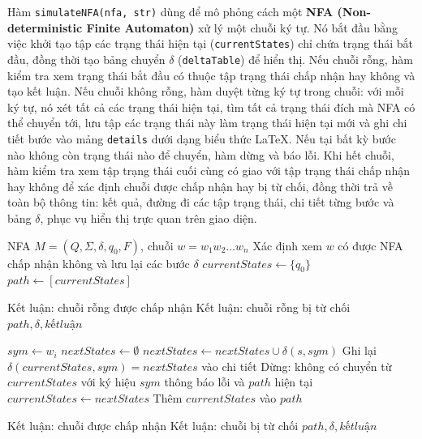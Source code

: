 \documentclass[12pt,a4paper]{report}
\begin{document}
Hàm \texttt{simulateNFA(nfa, str)} dùng để mô phỏng cách một \textbf{NFA (Non-deterministic Finite Automaton)} xử lý một chuỗi ký tự. Nó bắt đầu bằng việc khởi tạo tập các trạng thái hiện tại (\texttt{currentStates}) chỉ chứa trạng thái bắt đầu, đồng thời tạo bảng chuyển $\delta$ (\texttt{deltaTable}) để hiển thị. Nếu chuỗi rỗng, hàm kiểm tra xem trạng thái bắt đầu có thuộc tập trạng thái chấp nhận hay không và tạo kết luận. Nếu chuỗi không rỗng, hàm duyệt từng ký tự trong chuỗi: với mỗi ký tự, nó xét tất cả các trạng thái hiện tại, tìm tất cả trạng thái đích mà NFA có thể chuyển tới, lưu tập các trạng thái này làm trạng thái hiện tại mới và ghi chi tiết bước vào mảng \texttt{details} dưới dạng biểu thức LaTeX. Nếu tại bất kỳ bước nào không còn trạng thái nào để chuyển, hàm dừng và báo lỗi. Khi hết chuỗi, hàm kiểm tra xem tập trạng thái cuối cùng có giao với tập trạng thái chấp nhận hay không để xác định chuỗi được chấp nhận hay bị từ chối, đồng thời trả về toàn bộ thông tin: kết quả, đường đi các tập trạng thái, chi tiết từng bước và bảng $\delta$, phục vụ hiển thị trực quan trên giao diện.
\begin{algorithm}[H]
\caption{Mô phỏng một NFA với chuỗi đầu vào}
\begin{algorithmic}[1]
\Require NFA $M = (Q, \Sigma, \delta, q_0, F)$, chuỗi $w = w_1 w_2 \dots w_n$
\Ensure Xác định xem $w$ có được NFA chấp nhận không và lưu lại các bước $\delta$
\State $currentStates \gets \{q_0\}$
\State $path \gets [currentStates]$

        \State Kết luận: chuỗi rỗng được chấp nhận
    \Else
        \State Kết luận: chuỗi rỗng bị từ chối
    \EndIf
    \State \Return $path, \delta, kết luận$
\EndIf

    \State $sym \gets w_i$
    \State $nextStates \gets \emptyset$
            \State $nextStates \gets nextStates \cup \delta(s, sym)$
        \EndIf
    \EndFor
    \State Ghi lại $\delta(currentStates, sym) = nextStates$ vào chi tiết
        \State Dừng: không có chuyển từ $currentStates$ với ký hiệu $sym$
        \State \Return thông báo lỗi và $path$ hiện tại
    \EndIf
    \State $currentStates \gets nextStates$
    \State Thêm $currentStates$ vào $path$
\EndFor

    \State Kết luận: chuỗi được chấp nhận
\Else
    \State Kết luận: chuỗi bị từ chối
\EndIf
\State \Return $path, \delta, kết luận$
\end{algorithmic}
\end{algorithm}
\end{document}

